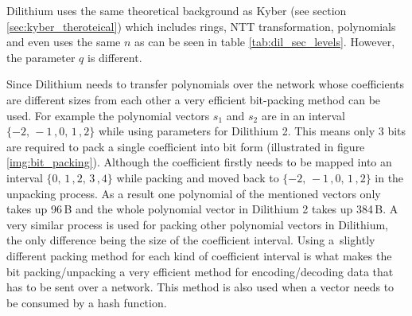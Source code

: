 Dilithium uses the same theoretical background as Kyber (see section \ref{sec:kyber_theroteical}) which includes rings, NTT transformation, polynomials and even uses the same $n$ as can be seen in table \ref{tab:dil_sec_levels}. However, the parameter $q$ is different.


Since Dilithium needs to transfer polynomials over the network whose coefficients are different sizes from each other a very efficient bit-packing method can be used. For example the polynomial vectors $s_1$ and $s_2$ are in an interval $\{-2,\,-1\,,0,\,1\,,2\}$ while using parameters for Dilithium 2. This means only 3 bits are required to pack a single coefficient into bit form (illustrated in figure \ref{img:bit_packing}). Although the coefficient firstly needs to be mapped into an interval $\{0,\,1\,,2,\,3\,,4\}$ while packing and moved back to $\{-2,\,-1\,,0,\,1\,,2\}$ in the unpacking process. As a result one polynomial of the mentioned vectors only takes up 96\,B and the whole polynomial vector in Dilithium 2 takes up 384\,B. A very similar process is used for packing other polynomial vectors in Dilithium, the only difference being the size of the coefficient interval. Using a~slightly different packing method for each kind of coefficient interval is what makes the bit packing/unpacking a very efficient method for encoding/decoding data that has to be sent over a network. This method is also used when a vector needs to be consumed by a hash function.
